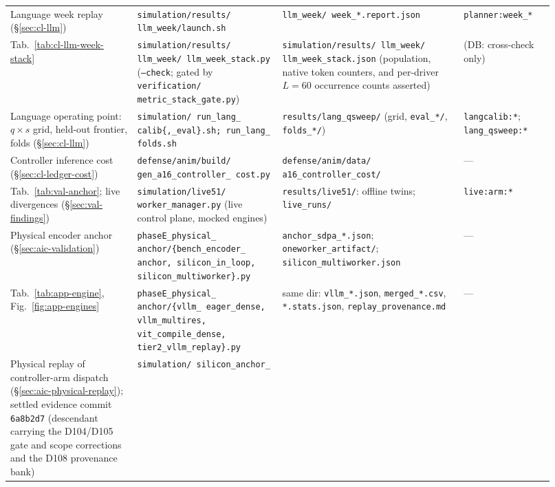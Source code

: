 {\begin{longtable}{@{}>{\raggedright\arraybackslash}p{0.215\linewidth}>{\raggedright\arraybackslash}p{0.245\linewidth}>{\raggedright\arraybackslash}p{0.30\linewidth}>{\raggedright\arraybackslash}p{0.155\linewidth}@{}}
Language week replay (\S\ref{sec:cl-llm}) &
  \texttt{simulation/results/ llm\_week/launch.sh} &
  \texttt{llm\_week/ week\_*.report.json} & \texttt{planner:week\_*} \\
Tab.~\ref{tab:cl-llm-week-stack} &
  \texttt{simulation/results/ llm\_week/ llm\_week\_stack.py}
  (\texttt{--check}; gated by
  \texttt{verification/ metric\_stack\_gate.py}) &
  \texttt{simulation/results/ llm\_week/ llm\_week\_stack.json}
  (population, native token counters, and per-driver $L{=}60$
  occurrence counts asserted) & (DB: cross-check only) \\
Language operating point: $q\times s$ grid, held-out frontier, folds
  (\S\ref{sec:cl-llm}) &
  \texttt{simulation/ run\_\allowbreak lang\_\allowbreak
  calib\allowbreak\{,\_eval\}.sh; run\_\allowbreak lang\_\allowbreak
  folds.sh} &
  \texttt{results/lang\_qsweep/} (grid, \texttt{eval\_*/}, \texttt{folds\_*/})
  & \texttt{langcalib:*}; \texttt{lang\_qsweep:*} \\
Controller inference cost (\S\ref{sec:cl-ledger-cost}) &
  \texttt{defense/anim/build/ gen\_a16\_controller\_ cost.py} &
  \texttt{defense/anim/data/ a16\_controller\_cost/} & --- \\
Tab.~\ref{tab:val-anchor}; live divergences (\S\ref{sec:val-findings}) &
  \texttt{simulation/live51/ worker\_manager.py} (live control plane, mocked
  engines) &
  \texttt{results/live51/}: offline twins; \texttt{live\_runs/} &
  \texttt{live:arm:*} \\
Physical encoder anchor (\S\ref{sec:aic-validation}) &
  \texttt{phaseE\_physical\_ anchor/\allowbreak\{bench\_encoder\_ anchor,
  silicon\_\allowbreak in\_\allowbreak loop,
  silicon\_\allowbreak multiworker\}.py} &
  \texttt{anchor\_sdpa\_*.json}; \texttt{oneworker\_artifact/};
  \texttt{silicon\_multiworker.json} & --- \\
Tab.~\ref{tab:app-engine}, Fig.~\ref{fig:app-engines} &
  \texttt{phaseE\_physical\_ anchor/\allowbreak\{vllm\_\allowbreak
  eager\_\allowbreak dense, vllm\_\allowbreak multires,
  vit\_\allowbreak compile\_\allowbreak dense,
  tier2\_\allowbreak vllm\_\allowbreak replay\}.py} &
  same dir: \texttt{vllm\_*.json}, \texttt{merged\_*.csv},
  \texttt{*.stats.json}, \texttt{replay\_provenance.md} & --- \\
Physical replay of controller-arm dispatch
  (\S\ref{sec:aic-physical-replay}); settled evidence commit
  \texttt{6a8b2d7} (descendant carrying the D104/D105 gate and scope
  corrections and the D108 provenance bank) &
  \texttt{simulation/ silicon\_\allowbreak anchor\_\allowbreak
}
\end{longtable}}
